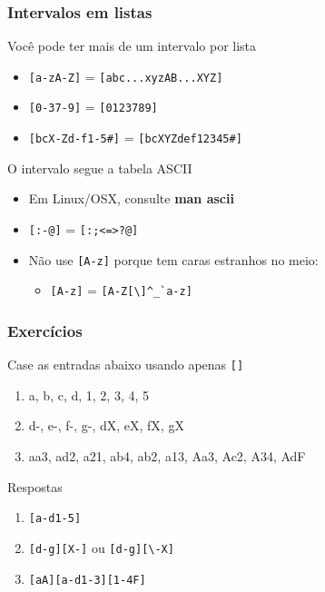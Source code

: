\documentclass{beamer}
\begin{document}
\begin{frame}[fragile]
 \frametitle{Intervalos em listas}
 \begin{block}{Você pode ter mais de um intervalo por lista}
  \begin{itemize}
   \item \texttt{[a-zA-Z]} = \texttt{[abc...xyzAB...XYZ]}
   \item \texttt{[0-37-9]} = \texttt{[0123789]}
   \item \texttt{[bcX-Zd-f1-5\#]} = \texttt{[bcXYZdef12345\#]}
  \end{itemize}
 \end{block}

 \pause
 \begin{block}{O intervalo segue a tabela ASCII}
  \begin{itemize}
   \item Em Linux/OSX, consulte \textbf{man ascii}
	\pause 
   \item \texttt{[:-@]} = \texttt{[:;<=>?@]}
	\pause
   \item Não use \texttt{[A-z]} porque tem caras estranhos no meio:
	\begin{itemize}
	 \item \texttt{[A-z]} = \verb=[A-Z[\]^_`a-z]=
	\end{itemize}
  \end{itemize}
 \end{block}
\end{frame}

\begin{frame}[fragile]
 \frametitle{Exercícios}
 \begin{block}{Case as entradas abaixo usando apenas \texttt{[]}}
  \begin{enumerate}
   \item a, b, c, d, 1, 2, 3, 4, 5
   \item d-, e-, f-, g-, dX, eX, fX, gX
   \item aa3, ad2, a21, ab4, ab2, a13, Aa3, Ac2, A34, AdF
  \end{enumerate}
 \end{block}

 \pause
 \begin{block}{Respostas}
  \begin{enumerate}
   \item \texttt{[a-d1-5]}
	\pause
   \item \texttt{[d-g][X-]} ou \verb=[d-g][\-X]=
	\pause
   \item \texttt{[aA][a-d1-3][1-4F]}
  \end{enumerate}
 \end{block}
\end{frame}
\end{document}
